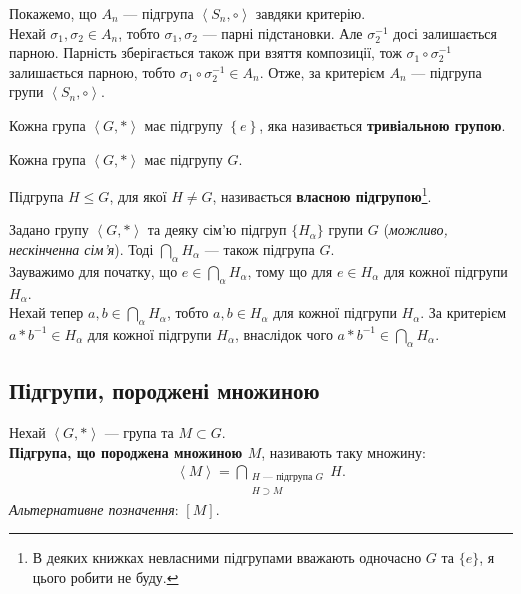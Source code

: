 \documentclass{math_library}
\begin{document}
\begin{example}
Покажемо, що $A_n$ --- підгрупа $\left< S_n, \circ \right>$ завдяки критерію.
\bigskip \\
Нехай $\sigma_1, \sigma_2 \in A_n$, тобто $\sigma_1, \sigma_2$ --- парні підстановки. Але $\sigma_2^{-1}$ досі залишається парною. Парність зберігається також при взяття композиції, тож $\sigma_1 \circ \sigma_2^{-1}$ залишається парною, тобто $\sigma_1 \circ \sigma_2^{-1} \in A_n$. Отже, за критерієм $A_n$ --- підгрупа групи $\left<S_n, \circ \right>$.
\end{example}

\begin{remark}
Кожна група $\left<G, *\right>$ має підгрупу $\left\{e\right\}$, яка називається \textbf{тривіальною групою}.
\end{remark}

\begin{remark}
Кожна група $\left<G, *\right>$ має підгрупу $G$.
\end{remark}

\begin{definition}
Підгрупа $H \leq G$, для якої $H \neq G$, називається \textbf{власною підгрупою}\footnote{В деяких книжках невласними підгрупами вважають одночасно $G$ та $\{e\}$, я цього робити не буду.}.
\end{definition}

\begin{example}
\label{intersection_of_subgroups_is_a_subgroup}
Задано групу $\left< G,*\right>$ та деяку сім'ю підгруп $\{H_\alpha\}$ групи $G$ (\textit{можливо, нескінченна сім'я}). Тоді $\displaystyle\bigcap_{\alpha} H_\alpha$ --- також підгрупа $G$.
\bigskip \\
Зауважимо для початку, що $e \in \displaystyle\bigcap_{\alpha} H_\alpha$, тому що для $e \in H_\alpha$ для кожної підгрупи $H_\alpha$.\\
Нехай тепер $a,b \in \displaystyle\bigcap_{\alpha} H_\alpha$, тобто $a,b \in H_\alpha$ для кожної підгрупи $H_\alpha$. За критерієм $a*b^{-1} \in H_\alpha$ для кожної підгрупи $H_\alpha$, внаслідок чого $a*b^{-1} \in \displaystyle\bigcap_{\alpha} H_\alpha$.
\end{example}

\subsection{Підгрупи, породжені множиною}
\begin{definition}
Нехай $\left< G, *\right>$ --- група та $M \subset G$.\\
\textbf{Підгрупа, що породжена множиною $M$}, називають таку множину:
\begin{align*}
\left<M\right> = \bigcap_{\substack{H \text{ --- підгрупа }G \\ H \supset M}} H.
\end{align*}
\textit{Альтернативне позначення}: $\left[ M \right]$.
\end{definition}
\end{document}
